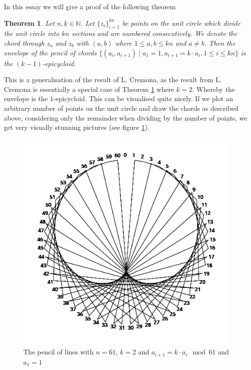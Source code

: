 \documentclass{article}
\newtheorem{theorem}{Theorem}
\newcommand{\N}{\mathbb{N}}
\begin{document}
In this essay we will give a proof of the following theorem
\begin{theorem}\label{thrm:epi}
    Let $n,k\in\N$. Let $\{z_i\}_{i=1}^{kn}$ be points on the unit circle which divide the unit circle into $kn$ sections and are numbered 
    consecutively. We denote the chord through $z_a$ and $z_b$ with $(a,b)$ where $1\leq a,b\leq kn$ and $a\neq b$. Then the envelope of the 
    pencil of chords $\{(a_i, a_{i+1})\mid a_1 = 1, a_{i+1}=k\cdot a_i, 1\leq i\leq kn\}$ is the $(k-1)$-epicycloid.
\end{theorem}
\newpage
This is a generalisation of the result of L. Cremona, as the result from L. Cremona is essentially a special case of Theorem \ref{thrm:epi} where $k=2$. 
Whereby the envelope is the $1$-epicycloid. This can be visualised quite nicely. If we plot an arbitrary number of points on the unit circle and draw 
the chords as described above, considering only the remainder when dividing by the number of points, we get very visually stunning pictures 
(see figure \ref{fig:cremona}).
\begin{figure}[ht]
    \centering
    \includegraphics[scale=0.3]{images/param2mod61.png}
    \caption{The pencil of lines with $n=61$, $k=2$ and $a_{i+1} = k\cdot a_i\mod 61$ and $a_1=1$}
    \label{fig:cremona}
\end{figure}
\end{document}
